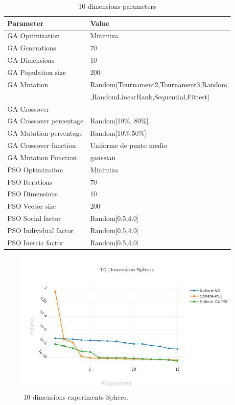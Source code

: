 \documentclass[runningheads]{llncs}
\begin{document}
    \begin{table}[htp]
      \caption{10 dimensions parameters}
      \label{table:ga-pso-parameters-10}
      \centering
      \begin{tabular}{|l|l|}
      \hline
      Parameter & Value \\
      \hline
      \hline
      GA Optimization & Minimiza \\
      \hline
GA Generations & 70 \\
      \hline
GA Dimensions & 10 \\
      \hline
GA Population size & 200 \\
      \hline
GA Mutation & Random(Tournament2,Tournament3,Random \\
      &  ,RandomLinearRank,Sequential,Fittest)\\
      \hline
GA Crossover \\
      \hline
GA Crossover percentage & Random[10\%, 80\%] \\
      \hline
GA Mutation percentage & Random[10\%,50\%] \\
      \hline
GA Crossover function & Uniforme de punto medio \\
      \hline
GA Mutation Function & gaussian \\
      \hline
PSO Optimization & Minimiza \\
      \hline
PSO Iterations & 70 \\
      \hline
PSO Dimensions & 10 \\
      \hline
PSO Vector size & 200 \\
      \hline
PSO Social factor & Random[0.5,4.0] \\
      \hline
PSO Individual factor & Random[0.5,4.0] \\
      \hline
PSO Inercia factor & Random[0.5,4.0] \\
      \hline
      \end{tabular}
      \end{table}
    
      \begin{figure}[htp]
        \includegraphics[width=\textwidth]{10-sphere.jpg}
        \caption{10 dimensions experiments Sphere.} \label{fig1}
        \end{figure}
\end{document}
